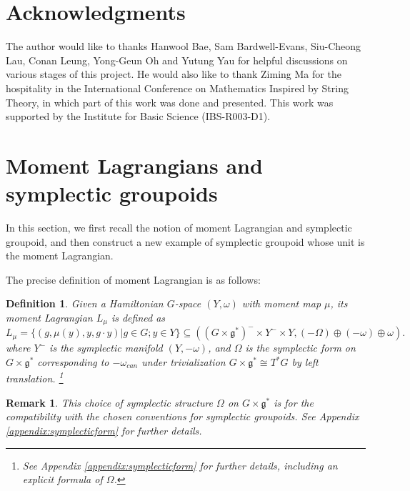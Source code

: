 \documentclass{amsart}
\newtheorem{defn}[theorem]{Definition}
\newtheorem{example}[theorem]{Example}
\newtheorem{remark}[theorem]{Remark}
\numberwithin{equation}{section}
\newcommand{\Ad}{\mathrm{Ad}}
\begin{document}
\section*{Acknowledgments}
The author would like to thanks Hanwool Bae, 	
Sam Bardwell-Evans, Siu-Cheong Lau, Conan Leung, Yong-Geun Oh and Yutung Yau for helpful discussions on various stages of this project. He would also like to thank Ziming Ma for the hospitality in the International Conference on Mathematics Inspired by String Theory, in which part of this work was done and presented.
This work was supported by the Institute for Basic Science (IBS-R003-D1).

\section{Moment Lagrangians and symplectic groupoids}


In this section, we first recall the notion of moment Lagrangian and symplectic groupoid, and then construct a new example of symplectic groupoid whose unit is the moment Lagrangian.

The precise definition of moment Lagrangian is as follows:

\begin{defn}\label{def:momentlag}
    Given a Hamiltonian $G$-space $(Y, \omega)$ with moment map $\mu$, its moment Lagrangian $L_\mu$ is defined as 
    $$L_\mu = \{(g, \mu(y), y, g\cdot y) | g\in G; y \in Y\} \subseteq ((G \times \mathfrak{g}^*)^- \times Y^- \times Y, (-\Omega) \oplus (-\omega) \oplus \omega).$$
    where $Y^-$ is the symplectic manifold $(Y, -\omega)$, and $\Omega$ is the symplectic form on $G \times \mathfrak{g}^*$ corresponding to $-\omega_{can}$ under trivialization $G \times \mathfrak{g}^* \cong T^*G$ by left translation. \footnote{See Appendix \ref{appendix:symplecticform} for further details, including an explicit formula of $\Omega$.}
\end{defn}

\begin{remark}
This choice of symplectic structure $\Omega$ on $G \times \mathfrak{g}^*$ is for the compatibility with the chosen conventions for symplectic groupoids. See Appendix \ref{appendix:symplecticform} for further details.
\end{remark}

    
\end{document}
